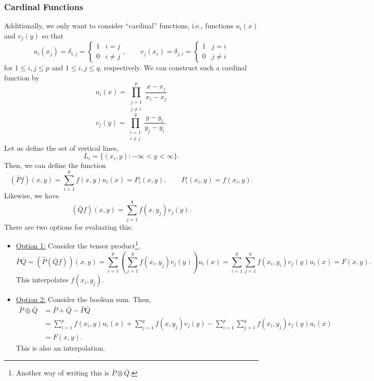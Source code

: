 \documentclass[letterpaper]{article}
\begin{document}
\subsubsection{Cardinal Functions}
Additionally, we only want to consider ``cardinal'' functions, i.e., functions $u_{i}(x)$ and $v_{j}(y)$ so that
\[u_{i}(x_{j}) = \delta_{i, j} = \begin{cases}
    1 & i = j \\ 
    0 & i \neq j
\end{cases}, \qquad v_{j}(x_{i}) = \delta_{j, i} = \begin{cases}
    1 & j = i \\ 
    0 & j \neq i
\end{cases}\]
for $1 \leq i, j \leq p$ and $1 \leq i, j \leq q$, respectively. We can construct such a cardinal function by 
\[u_{i}(x) = \prod_{\substack{j = 1 \\ j \neq i}}^{p} \frac{x - x_j}{x_i - x_j}\]
\[v_{j}(y) = \prod_{\substack{i = 1 \\ i \neq j}}^{q} \frac{y - y_i}{y_j - y_i}.\]
Let us define the set of vertical lines, 
\[L_{i} = \{(x_i, y) : -\infty < y < \infty\}.\]
Then, we can define the function \[(\bar{P}f)(x, y) = \sum_{i = 1}^{p} f(x, y) u_{i}(x) = P_{i}(x, y), \qquad P_{i}(x_{i}, y) = f(x_{i}, y).\]
Likewise, we have 
\[(\bar{Q}f)(x, y) = \sum_{j = 1}^{q} f(x, y_{j}) v_{j}(y).\]
There are two options for evaluating this: 
\begin{itemize}
    \item \underline{Option 1:} Consider the tensor product\footnote{Another way of writing this is $\bar{P} \otimes \bar{Q}$.}, 
    \[\bar{P}\bar{Q} = (\hat{P} (\bar{Q} f))(x, y) = \sum_{i = 1}^{p} \left( \sum_{j = 1}^{q} f(x_{i}, y_{j}) v_{j}(y) \right) u_{i}(x) = \sum_{i = 1}^{p} \sum_{j = 1}^{q} f(x_{i}, y_{i}) v_{j}(y) u_{i}(x) = F(x, y).\]
    This interpolates $f(x_{i}, y_{j}).$

    \item \underline{Option 2:} Consider the boolean sum. Then,  
    \begin{equation*}
        \begin{aligned}
            \bar{P} \oplus \bar{Q} &= \bar{P} + \bar{Q} - \bar{P}\bar{Q} \\
                &= \sum_{i = 1}^{p} f(x_{i}, y) u_{i}(x) + \sum_{j = 1}^{q} f(x, y_{j}) v_{j}(y) - \sum_{i = 1}^{p} \sum_{j = 1}^{q} f(x_{i}, y_{j}) v_{j}(y) u_{i}(x) \\ 
                    &= F(x, y).
        \end{aligned}
    \end{equation*}
    This is also an interpolation. 
\end{itemize}
\end{document}
